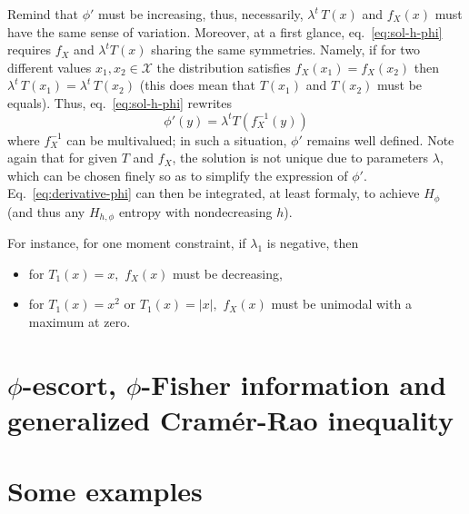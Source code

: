 \documentclass[english,onecolumn]{elsarticle}
\def\X{\mathcal{X}}
\begin{document}
Remind that $\phi'$  must be increasing, thus, necessarily,  $\lambda^t \, T(x)$
and $f_X(x)$ must have the same sense of variation. Moreover, at a first glance,
eq.~\eqref{eq:sol-h-phi} requires  $f_X$ and  $\lambda^t T(x)$ sharing  the same
symmetries.  Namely,  if  for  two  different  values  $x_1,  x_2  \in  \X$  the
distribution  satisfies  $f_X(x_1)  =  f_X(x_2)$  then $\lambda^t  \,  T(x_1)  =
\lambda^t  \,  T(x_2)$  (this does  mean  that  $T(x_1)$  and $T(x_2)$  must  be
equals). Thus, eq.~\eqref{eq:sol-h-phi} rewrites
%
\begin{equation}
\phi'(y) = \lambda^t T(f_X^{-1}(y))
\label{eq:derivative-phi}
\end{equation}
%
where $f_X^{-1}$ can  be multivalued; in such a  situation, $\phi'$ remains well
defined. Note again that for given $T$ and $f_X$, the solution is not unique due
to  parameters $\lambda$,  which can  be  chosen finely  so as  to simplify  the
expression of $\phi'$. Eq.~\eqref{eq:derivative-phi}  can then be integrated, at
least  formaly, to  achieve $H_\phi$  (and  thus any  $H_{h,\phi}$ entropy  with
nondecreasing $h$).

For instance, for one moment constraint, if $\lambda_1$ is negative, then
%
\begin{itemize}
\item for $T_1(x) = x,$ $f_X(x)$ must be decreasing, %
\item for $T_1(x) = x^2$ or $T_1(x) = |x|,$ $f_{X}(x)$ must be unimodal with
a maximum at zero. 
\end{itemize}




\section{$\phi$-escort, $\phi$-Fisher information and generalized Cram\'er-Rao inequality}



\section{Some examples}


\end{document}
